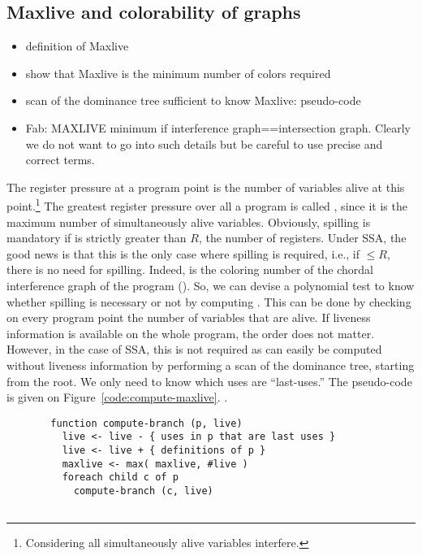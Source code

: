 {\subsection{Maxlive and colorability of graphs}

{\sl
\begin{itemize}
  \item definition of Maxlive
  \item show that Maxlive is the minimum number of colors required
  \item scan of the dominance tree sufficient to know Maxlive: pseudo-code
  \item Fab: MAXLIVE minimum if interference graph==intersection graph. Clearly we do not want to go into such details but be careful to use precise and correct terms.
\end{itemize}
}
    
The register pressure at a program point is the number of variables alive at 
this point.\footnote{Considering all simultaneously alive variables interfere.}
The greatest register pressure over all a program is called \maxlive, 
since it is the maximum number of simultaneously alive variables. Obviously, 
spilling is mandatory if \maxlive is strictly greater than $R$, the number of 
registers.
Under SSA, the good news is that this is the only case where spilling is 
required, i.e., if \maxlive $\leq R$, there is no need for spilling. Indeed, 
\maxlive is the coloring number of the chordal interference graph of the 
program (). So, we can devise a polynomial test to know 
whether spilling is necessary or not by computing \maxlive. This can be done by 
checking on every program point the number of variables that are alive. If 
liveness information is available on the whole program, the order does not 
matter. However, in the case of SSA, this is not required as \maxlive can 
easily be computed without liveness information by performing a scan of the 
dominance tree, starting from the root. We only need to know which uses are 
``last-uses.'' The pseudo-code is given on Figure~\ref{code:compute-maxlive}.
.


\begin{figure}[ht]
  \begin{verbatim}
  function compute-branch (p, live)
    live <- live - { uses in p that are last uses }
    live <- live + { definitions of p }
    maxlive <- max( maxlive, #live )
    foreach child c of p
      compute-branch (c, live)


\end{verbatim}
\end{figure}}
